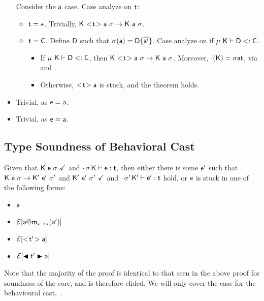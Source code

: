 \documentclass[acmlarge, anonymous, authordraft]{acmart}
\begin{document}
\begin{itemize}
      Consider the ${\sf{a}}$ case. Case analyze on $\t$:
      \begin{itemize}
        \item $\t = \any$. Trivially, $\Reduce\K{\SubCast\t\a}\s \K\a\s$.
        \item $\t = \C$. Define ${\sf{D}}$ such that $\sigma({\sf{a}}) = {\sf{D}}\{\overline{{\sf{a}}'}\}$. Case analyze on if $\mu~{\sf{K}}\vdash {\sf{D}}<: {\sf{C}}$.
        \begin{itemize}
          \item If $\mu~{\sf{K}}\vdash {\sf{D}}<: {\sf{C}}$, then $\Reduce\K{\SubCast\t\a}\s \K\a\s$. Moreover, $\HasType\cdot\K\s\a\t$, via  and .
          \item Otherwise, $\SubCast\t\a$ is stuck, and the theorem holds.
        \end{itemize}
      \end{itemize}
  
  \item {}
  
      Trivial, as ${\sf{e}}={\sf{a}}$.
  
  \item {}
  
      Trivial, as ${\sf{e}}={\sf{a}}$.

  
\end{itemize}


\subsection{Type Soundness of \kafka Behavioral Cast}

Given that ${\sf{K}}~{\sf{e}}~\sigma~\checkmark$ and $\EnvType\cdot\s\K\e\t$, then either there is some ${{{\sf{e'}}}}$ 
such that ${{\sf{K}}}~{{\sf{e}}}~{\sigma} \rightarrow {{\ensuremath{{\sf{K'}}}}}~{{{{\sf{e'}}}}}~{{{\sigma'}}}$ and ${{\sf{K'}}}~{{{\sf{e'}}}}~{{\sigma'}}~\checkmark$ and $\EnvType\cdot\sp\Kp\ep\t$ hold, 
or ${\sf{e}}$ is stuck in one of the following forms:
\begin{itemize} 
\item ${\sf{a}}$
\item $\EE[\DynCall\a\m{\ap}]$
\item $\EE[\SubCast\tp\a]$
\item $\EE[\BehCast\tp\a]$
\end{itemize}

Note that the majority of the proof is identical to that seen in the above proof
for soundness of the \kafka core, and is therefore elided. We will only cover
the case for the \kafka behavioural cast, .
\end{document}
